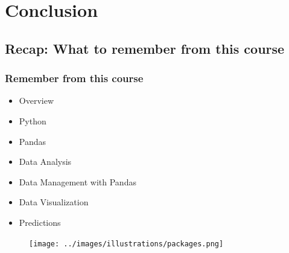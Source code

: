 



\begin{frame}
   \titlepage
\end{frame}



\begin{frame}
   \tableofcontents
\end{frame}

\section{Conclusion}


\subsection{Recap: What to remember from this course}



\begin{frame}\frametitle{Remember from this course}
   \begin{minipage}{0.48\linewidth}
      \begin{itemize}
         \item Overview
         \item Python
         \item Pandas
         \item Data Analysis
         \item Data Management with Pandas
         \item Data Visualization
         \item Predictions
      \end{itemize}
   \end{minipage}
   \begin{minipage}{0.48\linewidth}
      \begin{figure}[H]
         \texttt{[image: ../images/illustrations/packages.png]}
      \end{figure}
   \end{minipage}
\end{frame}

